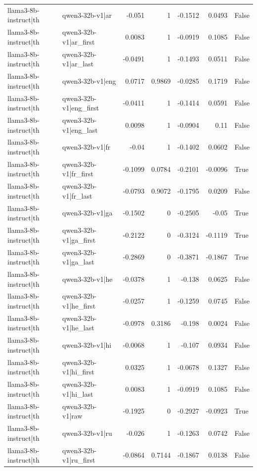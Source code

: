 \begin{table}
\begin{tabular}{l l r r r r l}
llama3-8b-instruct|th & qwen3-32b-v1|ar & -0.051 & 1 & -0.1512 & 0.0493 & False \\
llama3-8b-instruct|th & qwen3-32b-v1|ar_first & 0.0083 & 1 & -0.0919 & 0.1085 & False \\
llama3-8b-instruct|th & qwen3-32b-v1|ar_last & -0.0491 & 1 & -0.1493 & 0.0511 & False \\
llama3-8b-instruct|th & qwen3-32b-v1|eng & 0.0717 & 0.9869 & -0.0285 & 0.1719 & False \\
llama3-8b-instruct|th & qwen3-32b-v1|eng_first & -0.0411 & 1 & -0.1414 & 0.0591 & False \\
llama3-8b-instruct|th & qwen3-32b-v1|eng_last & 0.0098 & 1 & -0.0904 & 0.11 & False \\
llama3-8b-instruct|th & qwen3-32b-v1|fr & -0.04 & 1 & -0.1402 & 0.0602 & False \\
llama3-8b-instruct|th & qwen3-32b-v1|fr_first & -0.1099 & 0.0784 & -0.2101 & -0.0096 & True \\
llama3-8b-instruct|th & qwen3-32b-v1|fr_last & -0.0793 & 0.9072 & -0.1795 & 0.0209 & False \\
llama3-8b-instruct|th & qwen3-32b-v1|ga & -0.1502 & 0 & -0.2505 & -0.05 & True \\
llama3-8b-instruct|th & qwen3-32b-v1|ga_first & -0.2122 & 0 & -0.3124 & -0.1119 & True \\
llama3-8b-instruct|th & qwen3-32b-v1|ga_last & -0.2869 & 0 & -0.3871 & -0.1867 & True \\
llama3-8b-instruct|th & qwen3-32b-v1|he & -0.0378 & 1 & -0.138 & 0.0625 & False \\
llama3-8b-instruct|th & qwen3-32b-v1|he_first & -0.0257 & 1 & -0.1259 & 0.0745 & False \\
llama3-8b-instruct|th & qwen3-32b-v1|he_last & -0.0978 & 0.3186 & -0.198 & 0.0024 & False \\
llama3-8b-instruct|th & qwen3-32b-v1|hi & -0.0068 & 1 & -0.107 & 0.0934 & False \\
llama3-8b-instruct|th & qwen3-32b-v1|hi_first & 0.0325 & 1 & -0.0678 & 0.1327 & False \\
llama3-8b-instruct|th & qwen3-32b-v1|hi_last & 0.0083 & 1 & -0.0919 & 0.1085 & False \\
llama3-8b-instruct|th & qwen3-32b-v1|raw & -0.1925 & 0 & -0.2927 & -0.0923 & True \\
llama3-8b-instruct|th & qwen3-32b-v1|ru & -0.026 & 1 & -0.1263 & 0.0742 & False \\
llama3-8b-instruct|th & qwen3-32b-v1|ru_first & -0.0864 & 0.7144 & -0.1867 & 0.0138 & False \\

\end{tabular}
\end{table}
